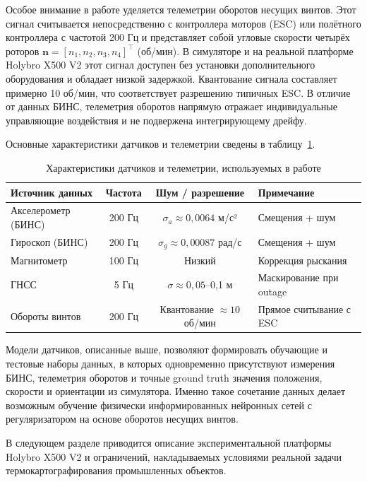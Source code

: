 Особое внимание в работе уделяется телеметрии оборотов несущих винтов. Этот сигнал считывается непосредственно с контроллера моторов (ESC) или полётного контроллера с частотой 200 Гц и представляет собой угловые скорости четырёх роторов \(\mathbf{n} = [n_1, n_2, n_3, n_4]^\top\) (об/мин). В симуляторе и на реальной платформе Holybro X500 V2 этот сигнал доступен без установки дополнительного оборудования и обладает низкой задержкой. Квантование сигнала составляет примерно 10 об/мин, что соответствует разрешению типичных ESC. В отличие от данных БИНС, телеметрия оборотов напрямую отражает индивидуальные управляющие воздействия и не подвержена интегрирующему дрейфу.

Основные характеристики датчиков и телеметрии сведены в таблицу~\ref{tab:sensors}.

\begin{table}[htbp]
	\centering
	\footnotesize
	\caption{Характеристики датчиков и телеметрии, используемых в работе}
	\label{tab:sensors}
	\begin{tabular}{|p{4.8cm}|c|c|p{5.5cm}|}
		\hline
		\textbf{Источник данных} & \textbf{Частота} & \textbf{Шум / разрешение} & \textbf{Примечание} \\
		\hline
		Акселерометр (БИНС) & 200 Гц & \(\sigma_a \approx 0{,}0064\) м/с² & Смещения + шум \\
		\hline
		Гироскоп (БИНС) & 200 Гц & \(\sigma_g \approx 0{,}00087\) рад/с & Смещения + шум \\
		\hline
		Магнитометр & 100 Гц & Низкий & Коррекция рыскания \\
		\hline
		ГНСС & 5 Гц & \(\sigma \approx 0{,}05\)–0{,}1 м & Маскирование при outage \\
		\hline
		Обороты винтов & 200 Гц & Квантование \(\approx 10\) об/мин & Прямое считывание с ESC \\
		\hline
	\end{tabular}
\end{table}

Модели датчиков, описанные выше, позволяют формировать обучающие и тестовые наборы данных, в которых одновременно присутствуют измерения БИНС, телеметрия оборотов и точные ground truth значения положения, скорости и ориентации из симулятора. Именно такое сочетание данных делает возможным обучение физически информированных нейронных сетей с регуляризатором на основе оборотов несущих винтов.

В следующем разделе приводится описание экспериментальной платформы Holybro X500 V2 и ограничений, накладываемых условиями реальной задачи термокартографирования промышленных объектов.

